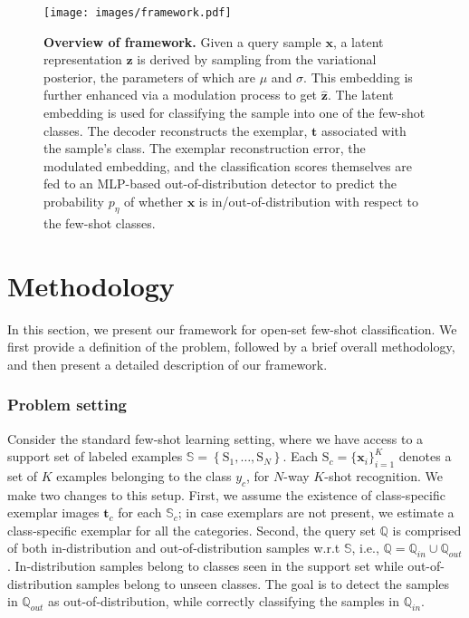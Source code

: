 \begin{figure*}[ht]
    \centering
    \texttt{[image: images/framework.pdf]}
    \caption{\textbf{Overview of framework.} Given a query sample $\mathbf{x}$, a latent representation $\mathbf{z}$ is derived by sampling from the variational posterior, the parameters of which are $\mu$ and $\sigma$. This embedding is further enhanced via a modulation process to get $\hat{\mathbf{z}}$. The latent embedding is used for classifying the sample into one of the few-shot classes. The decoder reconstructs the exemplar, $\mathbf{t}$ associated with the sample's class. The exemplar reconstruction error, the modulated embedding, and the classification scores themselves are fed to an MLP-based out-of-distribution detector to predict the probability $p_{\eta}$ of whether $\mathbf{x}$ is in/out-of-distribution with respect to the few-shot classes.}
    \vskip -0.1in
    \label{fig:framework}
\end{figure*}

\section{Methodology}
In this section, we present our framework for open-set few-shot classification. We first provide a  definition of the problem, followed by a brief overall methodology, and then present a detailed description of our framework.

\subsubsection*{Problem setting} 
Consider the standard few-shot learning setting, where we have access to a support set of labeled examples $\mathbb{S}=\left\{\mathrm{S}_1,\dots,\mathrm{S}_N\right\}$. Each $\mathrm{S}_c=\{\mathbf{x}_i\}_{i=1}^K$ denotes a set of $K$ examples belonging to the class $y_c$, for $N$-way $K$-shot recognition.  We make two changes to this setup. First, we assume the existence of class-specific exemplar images $\mathbf{t}_c$ for each $\mathbb{S}_c$; in case exemplars are not present, we estimate a class-specific exemplar for all the categories.  Second, the query set $\mathbb{Q}$ is comprised of both in-distribution and out-of-distribution samples w.r.t $\mathbb{S}$, i.e., $\mathbb{Q} = \mathbb{Q}_{in}\cup\mathbb{Q}_{out}$. In-distribution samples belong to classes seen in the support set while out-of-distribution samples belong to unseen classes. The goal is to detect the samples in $\mathbb{Q}_{out}$ as out-of-distribution, while correctly classifying the samples in $\mathbb{Q}_{in}$.

